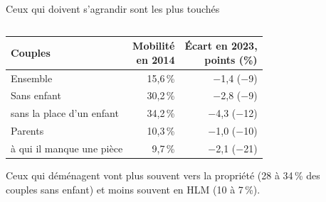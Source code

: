 \documentclass[10pt,aspectratio=169]{beamer}
\begin{document}
\begin{frame}{Ceux qui doivent s'agrandir sont les plus touchés}
  \begin{columns}[T]
    \begin{column}{0.55\textwidth}
      \footnotesize
      \begin{tabular}{@{}lrr@{}}
        \toprule
        Couples & \shortstack{Mobilité\\en 2014} & \shortstack{Écart en 2023,\\points (\%)} \\
        \midrule
        Ensemble & 15,6\,\% & $-$1,4 ($-$9) \\
        Sans enfant & 30,2\,\% & $-$2,8 ($-$9) \\
        \quad sans la place d'un enfant & 34,2\,\% & $-$4,3 ($-$12) \\
        Parents & 10,3\,\% & $-$1,0 ($-$10) \\
        \quad à qui il manque une pièce & 9,7\,\% & $-$2,1 ($-$21) \\
        \bottomrule
      \end{tabular}
      \vspace{0.3cm}

      \small Ceux qui déménagent vont plus souvent vers la propriété (28 à 34\,\% des couples sans enfant) et moins souvent en HLM (10 à 7\,\%).
    \end{column}
    \begin{column}{0.40\textwidth}
      \vspace{0.2cm}
    \end{column}
  \end{columns}
\end{frame}
\end{document}
